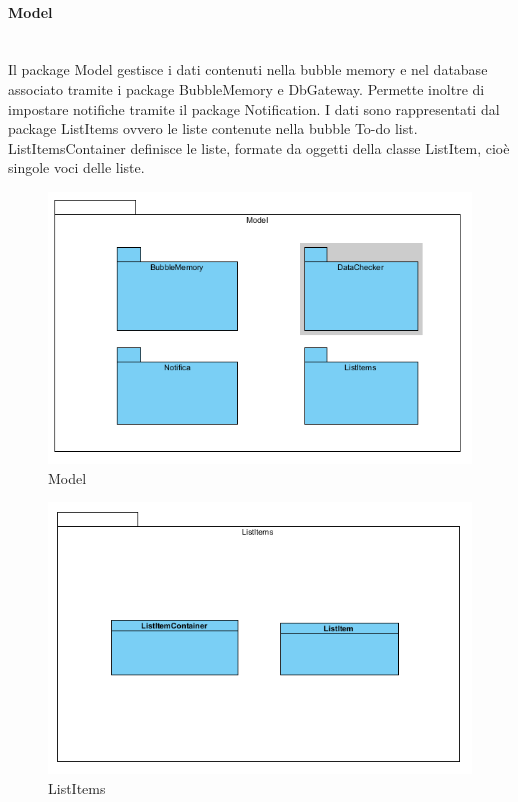 \paragraph{Model}\mbox{}\\
Il package Model gestisce i dati contenuti nella bubble memory e nel database associato tramite i package BubbleMemory e Db\-Gateway. Permette inoltre di impostare notifiche tramite il package Notification. I dati sono rappresentati dal package List\-Items ovvero le liste contenute nella bubble To-do list. List\-Items\-Container definisce le liste, formate da oggetti della classe List\-Item, cioè singole voci delle liste. 
\begin{figure}[H]
	\centering
	\includegraphics[width=14cm]{../../documenti/SpecificaTecnica/diagrammi_img/classi_e_package/todo_model.png}
	\caption{Model}
\end{figure}

\begin{figure}[H]
	\centering
	\includegraphics[width=14cm]{../../documenti/SpecificaTecnica/diagrammi_img/classi_e_package/todo_listitems.png}
	\caption{List\-Items}
\end{figure}

